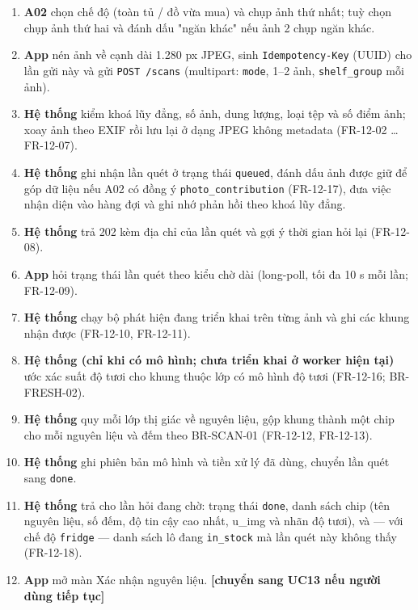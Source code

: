 \begin{enumerate}
\item \textbf{A02} chọn chế độ (toàn tủ /\allowbreak{} đồ vừa mua) và chụp ảnh thứ nhất; tuỳ chọn chụp ảnh thứ hai và đánh dấu "ngăn khác" nếu ảnh 2 chụp ngăn khác.
\item \textbf{App} nén ảnh về cạnh dài 1.280 px JPEG, sinh {\small\texttt{Idempotency-\allowbreak{}Key}} (UUID) cho lần gửi này và gửi {\small\texttt{POST /\allowbreak{}\allowbreak{}scans}} (multipart: {\small\texttt{mode}}, 1--2 ảnh, {\small\texttt{shelf\_\allowbreak{}\allowbreak{}group}} mỗi ảnh).
\item \textbf{Hệ thống} kiểm khoá lũy đẳng, số ảnh, dung lượng, loại tệp và số điểm ảnh; xoay ảnh theo EXIF rồi lưu lại ở dạng JPEG không metadata (FR-\allowbreak{}12-\allowbreak{}02 \ldots{} FR-\allowbreak{}12-\allowbreak{}07).
\item \textbf{Hệ thống} ghi nhận lần quét ở trạng thái {\small\texttt{queued}}, đánh dấu ảnh được giữ để góp dữ liệu nếu A02 có đồng ý {\small\texttt{photo\_\allowbreak{}\allowbreak{}contribution}} (FR-\allowbreak{}12-\allowbreak{}17), đưa việc nhận diện vào hàng đợi và ghi nhớ phản hồi theo khoá lũy đẳng.
\item \textbf{Hệ thống} trả 202 kèm địa chỉ của lần quét và gợi ý thời gian hỏi lại (FR-\allowbreak{}12-\allowbreak{}08).
\item \textbf{App} hỏi trạng thái lần quét theo kiểu chờ dài (long-\allowbreak{}poll, tối đa 10 s mỗi lần; FR-\allowbreak{}12-\allowbreak{}09).
\item \textbf{Hệ thống} chạy bộ phát hiện đang triển khai trên từng ảnh và ghi các khung nhận được (FR-\allowbreak{}12-\allowbreak{}10, FR-\allowbreak{}12-\allowbreak{}11).
\item \textbf{Hệ thống (chỉ khi có mô hình; chưa triển khai ở worker hiện tại)} ước xác suất độ tươi cho khung thuộc lớp có mô hình độ tươi (FR-\allowbreak{}12-\allowbreak{}16; BR-\allowbreak{}FRESH-\allowbreak{}02).
\item \textbf{Hệ thống} quy mỗi lớp thị giác về nguyên liệu, gộp khung thành một chip cho mỗi nguyên liệu và đếm theo BR-\allowbreak{}SCAN-\allowbreak{}01 (FR-\allowbreak{}12-\allowbreak{}12, FR-\allowbreak{}12-\allowbreak{}13).
\item \textbf{Hệ thống} ghi phiên bản mô hình và tiền xử lý đã dùng, chuyển lần quét sang {\small\texttt{done}}.
\item \textbf{Hệ thống} trả cho lần hỏi đang chờ: trạng thái {\small\texttt{done}}, danh sách chip (tên nguyên liệu, số đếm, độ tin cậy cao nhất, u\_\allowbreak{}img và nhãn độ tươi), và --- với chế độ {\small\texttt{fridge}} --- danh sách lô đang {\small\texttt{in\_\allowbreak{}\allowbreak{}stock}} mà lần quét này không thấy (FR-\allowbreak{}12-\allowbreak{}18).
\item \textbf{App} mở màn Xác nhận nguyên liệu. \textbf{[chuyển sang UC13 nếu người dùng tiếp tục]}
\end{enumerate}

